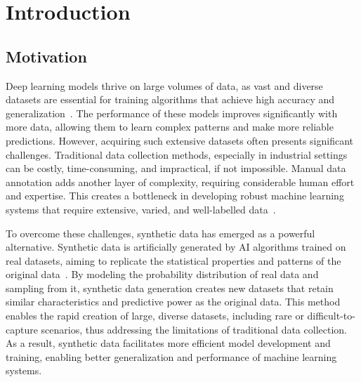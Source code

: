 \documentclass[12pt,DIV14,BCOR12mm,a4paper,footinclude=false,headinclude,parskip=half-,twoside,openright,cleardoublepage=empty,toc=index,bibliography=totoc,listof=totoc]{scrreprt}
\title{\maintitle}%
\subtitle{\translatedtitle}
\author{
\large
  \ifthenelse{\equal{\doclang}{german}}{
  \begin{tabular}{rp{7cm}}
    \Large 
    Autor:      & \Large \student \vspace*{2mm}\\
    Ausgabe:    & \startdate \\
    Abgabe:     & \submission \vspace*{3mm}\\
    Betreuer:   & \tutor \vspace*{2mm}\\
    Stichworte: & \keywords
  \end{tabular}
  }{
  \begin{tabular}{rp{7cm}}
    \Large 
    Author:             & \Large \student \vspace*{2mm}\\
    Date of work begin: & \startdate \\
    Date of submission: & \submission \vspace*{3mm}\\
    Supervisor:         & \tutor \vspace*{2mm}\\
    Keywords:           & \keywords
  \end{tabular}
  }
  \bugfix
}
\date{}
\numberwithin{equation}{chapter}
\begin{document}
\maketitle
{} %
\tableofcontents
\cleardoublepage
\setcounter{page}{1}


\chapter{Introduction}
\section{Motivation}
Deep learning models thrive on large volumes of data, as vast and diverse datasets are essential for training algorithms that achieve high accuracy and generalization~\cite{r1}. The performance of these models improves significantly with more data, allowing them to learn complex patterns and make more reliable predictions. However, acquiring such extensive datasets often presents significant challenges. Traditional data collection methods, especially in industrial settings can be costly, time-consuming, and impractical, if not impossible. Manual data annotation adds another layer of complexity, requiring considerable human effort and expertise. This creates a bottleneck in developing robust machine learning systems that require extensive, varied, and well-labelled data~\cite{anderson2022synthetic}.

To overcome these challenges, synthetic data has emerged as a powerful alternative. Synthetic data is artificially generated by AI algorithms trained on real datasets, aiming to replicate the statistical properties and patterns of the original data~\cite{r2}. By modeling the probability distribution of real data and sampling from it, synthetic data generation creates new datasets that retain similar characteristics and predictive power as the original data. This method enables the rapid creation of large, diverse datasets, including rare or difficult-to-capture scenarios, thus addressing the limitations of traditional data collection. As a result, synthetic data facilitates more efficient model development and training, enabling better generalization and performance of machine learning systems.
\end{document}

